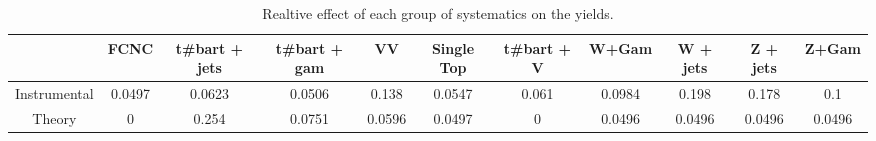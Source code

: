 \begin{table}[htbp]
\begin{center}
\begin{tabular}{|c|c|c|c|c|c|c|c|c|c|c|}
\hline 
      & FCNC      & t#bar{t} + jets      & t#bar{t} +  gam      & VV      & Single Top      & t#bar{t} + V      & W+Gam      & W + jets      & Z + jets      & Z+Gam \\ 
\hline 
 Instrumental & 0.0497 & 0.0623 & 0.0506 & 0.138 & 0.0547 & 0.061 & 0.0984 & 0.198 & 0.178 & 0.1 \\ 
 Theory & 0 & 0.254 & 0.0751 & 0.0596 & 0.0497 & 0 & 0.0496 & 0.0496 & 0.0496 & 0.0496 \\ 
\hline 
\end{tabular} 
\caption{Realtive effect of each group of systematics on the yields.} 
\end{center} 
\end{table} 
